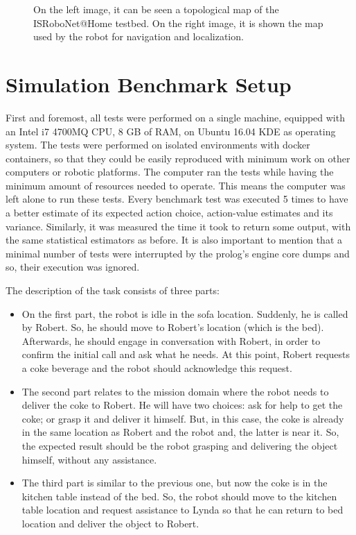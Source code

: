 \begin{figure}[H]
        \caption{On the left image, it can be seen a topological map of the
        ISRoboNet@Home testbed. On the right image, it is shown the map used
        by the robot for navigation and localization.}
        \label{fig:testbed}
\end{figure}

\section{Simulation Benchmark Setup}

First and foremost, all tests were performed on a single machine, equipped with
an Intel i7 4700MQ CPU, 8 GB of RAM, on Ubuntu 16.04 KDE as operating system.
The tests were performed on isolated environments with docker containers, so
that they could be easily reproduced with minimum work on other computers or
robotic platforms. The computer ran the tests while having the minimum amount of
resources needed to
operate. This means the computer was left alone to run these tests.
Every benchmark test was executed 5 times to have a better estimate of its
expected action choice, action-value estimates and its variance. Similarly, it
was measured the time it took to return some output, with the same statistical
estimators as before. It is also important to mention that a minimal number of
tests were interrupted by the prolog's engine core dumps and so, their execution
was ignored.

The description of the task consists of three parts:
\begin{itemize}
	\item On the first part, the robot is idle in the sofa location. Suddenly, he 
    is called by Robert. So, he should move to Robert's location (which is the bed).
    Afterwards, he should engage in conversation with Robert, in order to confirm the
    initial call and ask what he needs. At this point, Robert requests a coke beverage 
    and the robot should acknowledge this request.
    \item The second part relates to the mission domain where the robot needs to deliver
    the coke to Robert. He will have two choices: ask for help to get the coke; or grasp it
    and deliver it himself. But, in this case, the coke is already in the same location as 
    Robert and the robot and, the latter is near it. So, the expected result should be the
    robot grasping and delivering the object himself, without any assistance.
    \item The third part is similar to the previous one, but now the coke is in the kitchen table
    instead of the bed. So, the robot should move to the kitchen table location and request assistance
    to Lynda so that he can return to bed location and deliver the object to Robert.
\end{itemize}

